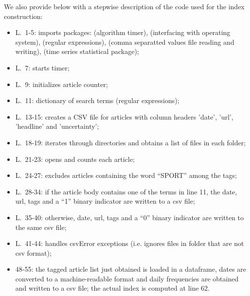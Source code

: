 \documentclass[12pt]{article}
\begin{document}
We also provide below with a stepwise description of the code used for the index construction:
\begin{itemize}
\item L.~1-5: imports packages:  (algorithm timer),  (interfacing
with operating system),  (regular expressions),  (comma separatted
values file reading and writing),  (time series statistical package);

\item L.~7: starts timer;

\item L.~9: initializes article counter;

\item L.~11: dictionary of search terms (regular expressions);

\item L.~13-15: creates a CSV file for articles with column headers 'date', 'url', 'headline' and 'uncertainty';

\item L.~18-19: iterates through directories and obtains a list of files in each folder;

\item L.~21-23: opens and counts each article;

\item L.~24-27: excludes articles containing the word ``SPORT'' among the tags;

\item L.~28-34: if the article body contains one of the terms in line 11, the date, url, tags and a ``1'' binary indicator are written to a csv file;

\item L.~35-40: otherwise, date, url, tags and a ``0'' binary indicator are written to the same csv file;

\item L.~41-44: handles csvError exceptions (i.e. ignores files in folder that are not csv format);

\item 48-55: the tagged article list just obtained is loaded in a  dataframe, dates are converted to a machine-readable format and daily
frequencies are obtained and written to a csv file; the actual index is computed at line 62.
\end{itemize}
\end{document}
